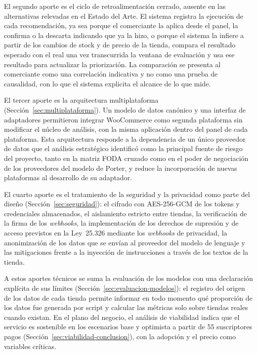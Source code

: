 El segundo aporte es el ciclo de retroalimentación cerrado, ausente en las alternativas relevadas en el Estado del Arte. El sistema registra la ejecución de cada recomendación, ya sea porque el comerciante la aplica desde el panel, la confirma o la descarta indicando que ya la hizo, o porque el sistema la infiere a partir de los cambios de stock y de precio de la tienda,
 compara el resultado esperado con el real una vez transcurrida la ventana de evaluación y usa ese resultado para actualizar la priorización. La comparación se presenta al comerciante como una correlación indicativa y no como una prueba de causalidad, con lo que el sistema explicita el alcance de lo que mide.

El tercer aporte es la arquitectura multiplataforma (Sección~\ref{sec:multiplataforma}). Un modelo de datos canónico y una interfaz de adaptadores permitieron integrar WooCommerce como segunda plataforma sin modificar el núcleo de análisis, con la misma aplicación dentro del panel de cada plataforma. Esta arquitectura responde a la dependencia de un único proveedor de datos que el análisis estratégico identificó como la principal fuente de riesgo del proyecto, tanto en la matriz FODA cruzado como en el poder de negociación de los proveedores del modelo de Porter, y reduce la incorporación de nuevas plataformas al desarrollo de su adaptador.

El cuarto aporte es el tratamiento de la seguridad y la privacidad como parte del diseño (Sección~\ref{sec:seguridad}): el cifrado con AES-256-GCM de los tokens y credenciales almacenados, el aislamiento estricto entre tiendas, la verificación de la firma de los \emph{webhooks}, la implementación de los derechos de supresión y de acceso previstos en la Ley~25.326 mediante los \emph{webhooks} de privacidad, la anonimización de los datos que se envían al proveedor del modelo de lenguaje y las mitigaciones frente a la inyección de instrucciones a través de los textos de la tienda.

A estos aportes técnicos se suma la evaluación de los modelos con una declaración explícita de sus límites (Sección~\ref{sec:evaluacion-modelos}): el registro del origen de los datos de cada tienda permite informar en todo momento qué proporción de los datos fue generada por script y calcular las métricas solo sobre tiendas reales cuando existan. En el plano del negocio, el análisis de viabilidad indica que el servicio es sostenible en los escenarios base y optimista a partir de 55 suscriptores pagos (Sección~\ref{sec:viabilidad-conclusion}), con la adopción y el precio como variables críticas.

